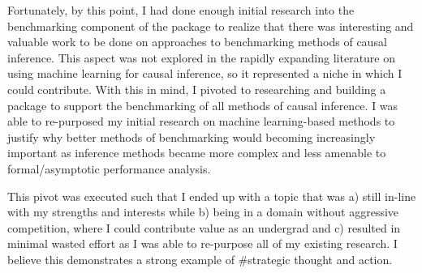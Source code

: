 \documentclass[./main.tex]{subfiles}
\begin{document}
Fortunately, by this point, I had done enough initial research into the benchmarking component of the package to realize that there was interesting and valuable work to be done on approaches to benchmarking methods of causal inference. This aspect was not explored in the rapidly expanding literature on using machine learning for causal inference, so it represented a niche in which I could contribute. With this in mind, I pivoted to researching and building a package to support the benchmarking of all methods of causal inference. I was able to re-purposed my initial research on machine learning-based methods to justify why better methods of benchmarking would becoming increasingly important as inference methods became more complex and less amenable to formal/asymptotic performance analysis.

\vspace{\baselineskip}

This pivot was executed such that I ended up with a topic that was a) still in-line with my strengths and interests while b) being in a domain without aggressive competition, where I could contribute value as an undergrad and c) resulted in minimal wasted effort as I was able to re-purpose all of my existing research. I believe this demonstrates a strong example of \#strategic thought and action.







\end{document}
